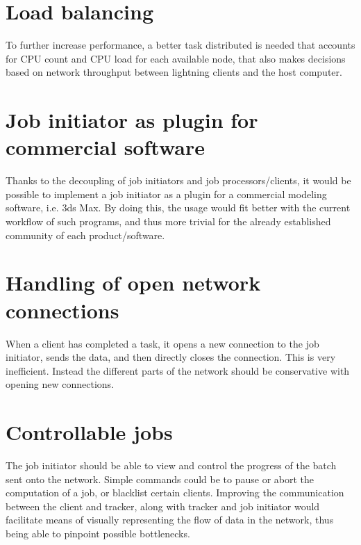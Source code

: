 \section{Load balancing}
To further increase performance, a better task distributed is needed that 
accounts for CPU count and CPU load for each available node, that also makes
decisions based on network throughput between lightning clients and the host
computer.

\section{Job initiator as plugin for commercial software}
Thanks to the decoupling of job initiators and job processors/clients, it
would be possible to implement a job initiator as a plugin for a commercial
modeling software, i.e. 3ds Max. By doing this, the usage would fit better
with the current workflow of such programs, and thus more trivial for the
already established community of each product/software.

\section{Handling of open network connections}
When a client has completed a task, it opens a new connection to the job
initiator, sends the data, and then directly closes the connection.
This is very inefficient. Instead the different parts of the network should
be conservative with opening new connections.

\section{Controllable jobs}
The job initiator should be able to view and control the progress of the batch
sent onto the network. Simple commands could be to pause or abort the
computation of a job, or blacklist certain clients. Improving the communication
between the client and tracker, along with tracker and job initiator would
facilitate means of visually representing the flow of data in the network, thus
being able to pinpoint possible bottlenecks.


